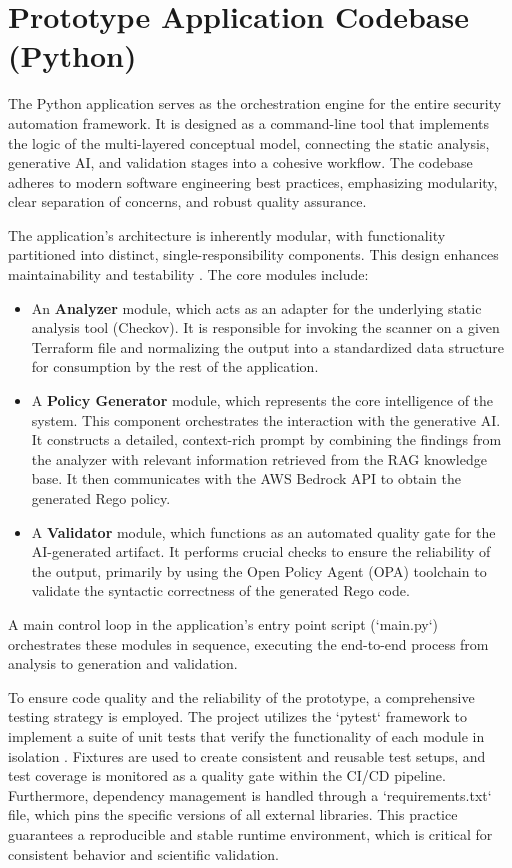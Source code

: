 \section{Prototype Application Codebase (Python)}

The Python application serves as the orchestration engine for the entire security automation framework. It is designed as a command-line tool that implements the logic of the multi-layered conceptual model, connecting the static analysis, generative AI, and validation stages into a cohesive workflow. The codebase adheres to modern software engineering best practices, emphasizing modularity, clear separation of concerns, and robust quality assurance.

The application's architecture is inherently modular, with functionality partitioned into distinct, single-responsibility components. This design enhances maintainability and testability \cite{martin_clean_2008}. The core modules include:

\begin{itemize}
    \item An \textbf{Analyzer} module, which acts as an adapter for the underlying static analysis tool (Checkov). It is responsible for invoking the scanner on a given Terraform file and normalizing the output into a standardized data structure for consumption by the rest of the application.
    \item A \textbf{Policy Generator} module, which represents the core intelligence of the system. This component orchestrates the interaction with the generative AI. It constructs a detailed, context-rich prompt by combining the findings from the analyzer with relevant information retrieved from the RAG knowledge base. It then communicates with the AWS Bedrock API to obtain the generated Rego policy.
    \item A \textbf{Validator} module, which functions as an automated quality gate for the AI-generated artifact. It performs crucial checks to ensure the reliability of the output, primarily by using the Open Policy Agent (OPA) toolchain to validate the syntactic correctness of the generated Rego code.
\end{itemize}

A main control loop in the application's entry point script (`main.py`) orchestrates these modules in sequence, executing the end-to-end process from analysis to generation and validation.

To ensure code quality and the reliability of the prototype, a comprehensive testing strategy is employed. The project utilizes the `pytest` framework to implement a suite of unit tests that verify the functionality of each module in isolation \cite{okken_python_2017}. Fixtures are used to create consistent and reusable test setups, and test coverage is monitored as a quality gate within the CI/CD pipeline. Furthermore, dependency management is handled through a `requirements.txt` file, which pins the specific versions of all external libraries. This practice guarantees a reproducible and stable runtime environment, which is critical for consistent behavior and scientific validation.

